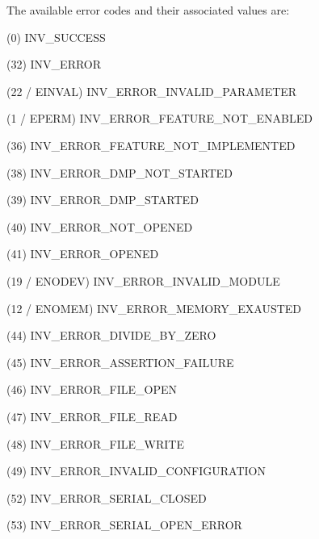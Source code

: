 The available error codes and their associated values are\+:
\begin{DoxyItemize}
\item (0) I\+N\+V\+\_\+\+S\+U\+C\+C\+E\+S\+S
\item (32) I\+N\+V\+\_\+\+E\+R\+R\+O\+R
\item (22 / E\+I\+N\+V\+A\+L) I\+N\+V\+\_\+\+E\+R\+R\+O\+R\+\_\+\+I\+N\+V\+A\+L\+I\+D\+\_\+\+P\+A\+R\+A\+M\+E\+T\+E\+R
\item (1 / E\+P\+E\+R\+M) I\+N\+V\+\_\+\+E\+R\+R\+O\+R\+\_\+\+F\+E\+A\+T\+U\+R\+E\+\_\+\+N\+O\+T\+\_\+\+E\+N\+A\+B\+L\+E\+D
\item (36) I\+N\+V\+\_\+\+E\+R\+R\+O\+R\+\_\+\+F\+E\+A\+T\+U\+R\+E\+\_\+\+N\+O\+T\+\_\+\+I\+M\+P\+L\+E\+M\+E\+N\+T\+E\+D
\item (38) I\+N\+V\+\_\+\+E\+R\+R\+O\+R\+\_\+\+D\+M\+P\+\_\+\+N\+O\+T\+\_\+\+S\+T\+A\+R\+T\+E\+D
\item (39) I\+N\+V\+\_\+\+E\+R\+R\+O\+R\+\_\+\+D\+M\+P\+\_\+\+S\+T\+A\+R\+T\+E\+D
\item (40) I\+N\+V\+\_\+\+E\+R\+R\+O\+R\+\_\+\+N\+O\+T\+\_\+\+O\+P\+E\+N\+E\+D
\item (41) I\+N\+V\+\_\+\+E\+R\+R\+O\+R\+\_\+\+O\+P\+E\+N\+E\+D
\item (19 / E\+N\+O\+D\+E\+V) I\+N\+V\+\_\+\+E\+R\+R\+O\+R\+\_\+\+I\+N\+V\+A\+L\+I\+D\+\_\+\+M\+O\+D\+U\+L\+E
\item (12 / E\+N\+O\+M\+E\+M) I\+N\+V\+\_\+\+E\+R\+R\+O\+R\+\_\+\+M\+E\+M\+O\+R\+Y\+\_\+\+E\+X\+A\+U\+S\+T\+E\+D
\item (44) I\+N\+V\+\_\+\+E\+R\+R\+O\+R\+\_\+\+D\+I\+V\+I\+D\+E\+\_\+\+B\+Y\+\_\+\+Z\+E\+R\+O
\item (45) I\+N\+V\+\_\+\+E\+R\+R\+O\+R\+\_\+\+A\+S\+S\+E\+R\+T\+I\+O\+N\+\_\+\+F\+A\+I\+L\+U\+R\+E
\item (46) I\+N\+V\+\_\+\+E\+R\+R\+O\+R\+\_\+\+F\+I\+L\+E\+\_\+\+O\+P\+E\+N
\item (47) I\+N\+V\+\_\+\+E\+R\+R\+O\+R\+\_\+\+F\+I\+L\+E\+\_\+\+R\+E\+A\+D
\item (48) I\+N\+V\+\_\+\+E\+R\+R\+O\+R\+\_\+\+F\+I\+L\+E\+\_\+\+W\+R\+I\+T\+E
\item (49) I\+N\+V\+\_\+\+E\+R\+R\+O\+R\+\_\+\+I\+N\+V\+A\+L\+I\+D\+\_\+\+C\+O\+N\+F\+I\+G\+U\+R\+A\+T\+I\+O\+N
\item (52) I\+N\+V\+\_\+\+E\+R\+R\+O\+R\+\_\+\+S\+E\+R\+I\+A\+L\+\_\+\+C\+L\+O\+S\+E\+D
\item (53) I\+N\+V\+\_\+\+E\+R\+R\+O\+R\+\_\+\+S\+E\+R\+I\+A\+L\+\_\+\+O\+P\+E\+N\+\_\+\+E\+R\+R\+O\+R

\end{DoxyItemize}
